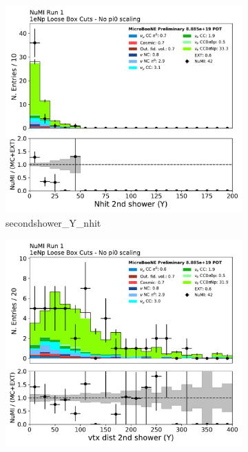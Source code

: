 \begin{figure}[H]
    \centering
    \begin{subfigure}{0.3\textwidth}
    \includegraphics[width=1.0\textwidth]{Sidebands/Figures/NuMI/1eNp/secondshower_Y_nhit.pdf}
    \caption{secondshower\_Y\_nhit}
    \end{subfigure}
    \begin{subfigure}{0.3\textwidth}
    \includegraphics[width=1.0\textwidth]{Sidebands/Figures/NuMI/1eNp/secondshower_Y_vtxdist.pdf}

\end{subfigure}
\end{figure}
